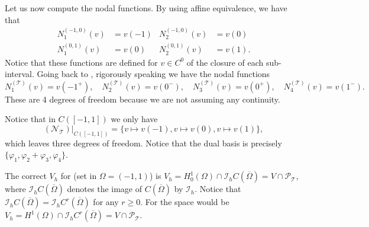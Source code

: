 \begin{example}
    Let us now compute the nodal functions.
    By using affine equivalence, we have that
    \begin{align*}
        N_1^{(-1,0)}(v) & = v(-1) & N_2^{(-1,0)}(v) & = v(0)  \\
        N_1^{(0,1)}(v)  & = v(0)  & N_2^{(0,1)}(v)  & = v(1).
    \end{align*}
    Notice that these functions are defined for $v \in C^0$ of the closure of each sub-interval.
    Going back to , rigorously speaking we have the nodal functions
    \begin{equation*}
        N_1^{(\mathcal T)}(v) = v(-1^+) , \quad
        N_2^{(\mathcal T)}(v) = v(0^-), \quad
        N_3^{(\mathcal T)}(v) = v(0^+), \quad
        N_4^{(\mathcal T)}(v) = v(1^-).
    \end{equation*}
    These are 4 degrees of freedom because we are not assuming any continuity.

    Notice that in $C([-1,1])$ we only have
    \begin{equation*}
        (\mathcal N_{\mathcal T})\big|_{C([-1,1])} = \{ v \mapsto v(-1), v \mapsto v(0), v \mapsto v(1) \},
    \end{equation*}
    which leaves three degrees of freedom.
    Notice that the dual basis is precisely $\{\varphi_1, \varphi_2 + \varphi_3, \varphi_4\}$.

    \bigskip

    The correct $V_h$ for  (set in $\Omega = (-1,1)$) is $V_h = H_0^1(\Omega) \cap \mathcal I_h C(\overline \Omega) = V \cap \mathcal P_{\mathcal T}$, where $\mathcal I_h C(\overline\Omega)$ denotes the image of $C(\overline \Omega)$ by $\mathcal I_h$. Notice that $\mathcal I_h C(\overline\Omega) = \mathcal I_h C^r(\overline\Omega)$ for any $r \ge 0$. For  the space would be $V_h = H^1(\Omega) \cap \mathcal I_h C^r(\overline\Omega) = V \cap \mathcal P_{\mathcal T}$.

\end{example}

